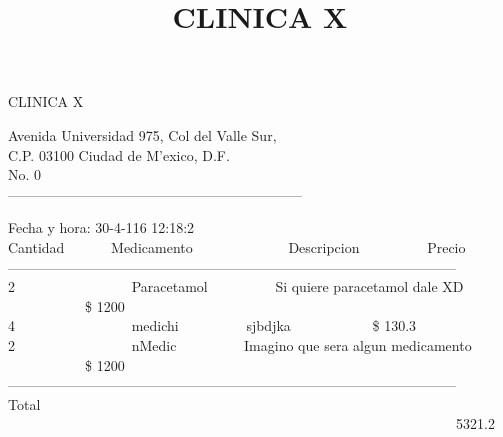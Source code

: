 \documentclass[10pt,a4paper]{letter}
\title{\bf CLINICA X}
\begin{document}
\begin{center}
{\scshape\LARGE CLINICA X\par}
{Avenida Universidad 975, Col del Valle Sur,\\}
{C.P. 03100 Ciudad de M'exico, D.F.}\\ 
{No. 0}\\ 
---------------------------------------------------------------
\end{center}

Fecha y hora: 30-4-116 12:18:2\\

Cantidad \ \ \ \ \ \ Medicamento \ \ \ \ \ \ \ \ \ \ \ \ \  Descripcion  \ \ \ \ \ \ \ \ \ Precio \\
------------------------------------------------------------------------------------------------ \\
2 \ \ \ \ \ \ \ \ \ \ \ \ \ \ \ \ Paracetamol \ \ \ \ \ \ \ \ \ Si quiere paracetamol dale XD \ \ \ \ \ \ \ \ \ \ \ \$ 1200 \\
4 \ \ \ \ \ \ \ \ \ \ \ \ \ \ \ \ medichi \ \ \ \ \ \ \ \ \ sjbdjka \ \ \ \ \ \ \ \ \ \ \ \$ 130.3 \\
2 \ \ \ \ \ \ \ \ \ \ \ \ \ \ \ \ nMedic \ \ \ \ \ \ \ \ \ Imagino que sera algun medicamento \ \ \ \ \ \ \ \ \ \ \ \$ 1200 \\

------------------------------------------------------------------------------------------------ \\
Total	\ \ \ \ \ \ \ \ \ \ \ \ \  \ \ \ \ \ \ \ \ \ \ \ \ \ \ \ \ \ \ \ \ \ \ \ \ \ \ \ \ \ \ \ \ \ \ \ \ \ \ \ \ \  \ \ \ \ \ \ \ \ \ \ 5321.2 \\
 
\end{document}

